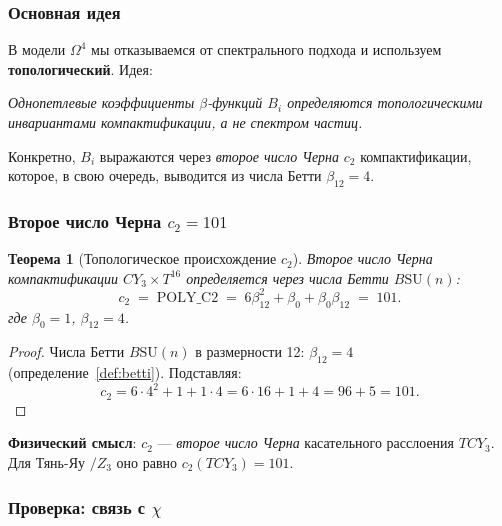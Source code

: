 \documentclass[11pt,a4paper]{article}
\newcommand{\SU}{\ensuremath{\mathrm{SU}}}
\newcommand{\CY}{\ensuremath{CY_3}}
\newcommand{\Om}{\ensuremath{\Omega^4}}
\newtheorem{theorem}{Теорема}[section]
\theoremstyle{definition}
\begin{document}
\subsubsection{Основная идея}

В модели $\Om$ мы отказываемся от спектрального подхода
и используем \textbf{топологический}. Идея:

\begin{center}
\emph{Однопетлевые коэффициенты $\beta$-функций $B_i$ определяются
топологическими инвариантами компактификации, а не спектром
частиц.}
\end{center}

Конкретно, $B_i$ выражаются через \emph{второе число Черна}
$c_2$ компактификации, которое, в свою очередь, выводится
из числа Бетти $\beta_{12} = 4$.

\subsubsection{Второе число Черна \texorpdfstring{$c_2 = 101$}{c\_2 = 101}}

\begin{theorem}[Топологическое происхождение $c_2$]
\label{thm:c2-topology}
Второе число Черна компактификации $\CY \times T^{16}$
определяется через числа Бетти $B\SU(n)$:
\begin{equation}
    \boxed{
    c_2 \;=\; \text{POLY\_C2} \;=\;
    6 \beta_{12}^2 + \beta_0 + \beta_0 \beta_{12} \;=\; 101.
    }
    \label{eq:c2-topology}
\end{equation}
где $\beta_0 = 1$, $\beta_{12} = 4$.
\end{theorem}

\begin{proof}
Числа Бетти $B\SU(n)$ в размерности 12: $\beta_{12} = 4$
(определение~\ref{def:betti}). Подставляя:
\begin{equation}
    c_2 = 6 \cdot 4^2 + 1 + 1 \cdot 4 = 6 \cdot 16 + 1 + 4
    = 96 + 5 = 101.
\end{equation}
\end{proof}

\medskip\noindent
\textbf{Физический смысл}: $c_2$ --- \emph{второе число Черна}
касательного расслоения $T\CY$. Для Тянь-Яу $/Z_3$ оно равно
$c_2(T\CY) = 101$.

\subsubsection{Проверка: связь с \texorpdfstring{$\chi$}{}}
\end{document}
